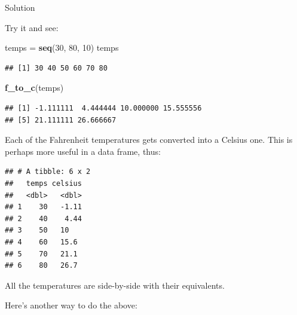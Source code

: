 \documentclass[]{tufte-book}
\newenvironment{Shaded}{}{}
\newcommand{\DataTypeTok}[1]{\textcolor[rgb]{0.56,0.13,0.00}{#1}}
\newcommand{\DecValTok}[1]{\textcolor[rgb]{0.25,0.63,0.44}{#1}}
\newcommand{\KeywordTok}[1]{\textcolor[rgb]{0.00,0.44,0.13}{\textbf{#1}}}
\newcommand{\NormalTok}[1]{#1}
\newcommand{\OperatorTok}[1]{\textcolor[rgb]{0.40,0.40,0.40}{#1}}
\newcommand{\StringTok}[1]{\textcolor[rgb]{0.25,0.44,0.63}{#1}}
\theoremstyle{definition}
\theoremstyle{definition}
\theoremstyle{definition}
\theoremstyle{remark}
\begin{document}
Solution

Try it and see:

\begin{Shaded}
\begin{Highlighting}[]
\NormalTok{temps =}\StringTok{ }\KeywordTok{seq}\NormalTok{(}\DecValTok{30}\NormalTok{, }\DecValTok{80}\NormalTok{, }\DecValTok{10}\NormalTok{)}
\NormalTok{temps}
\end{Highlighting}
\end{Shaded}

\begin{verbatim}
## [1] 30 40 50 60 70 80
\end{verbatim}

\begin{Shaded}
\begin{Highlighting}[]
\KeywordTok{f_to_c}\NormalTok{(temps)}
\end{Highlighting}
\end{Shaded}

\begin{verbatim}
## [1] -1.111111  4.444444 10.000000 15.555556
## [5] 21.111111 26.666667
\end{verbatim}

Each of the Fahrenheit temperatures gets converted into a Celsius one.
This is perhaps more useful in a data frame, thus:

\begin{Shaded}
\end{Shaded}

\begin{verbatim}
## # A tibble: 6 x 2
##   temps celsius
##   <dbl>   <dbl>
## 1    30   -1.11
## 2    40    4.44
## 3    50   10   
## 4    60   15.6 
## 5    70   21.1 
## 6    80   26.7
\end{verbatim}

All the temperatures are side-by-side with their equivalents.

Here's another way to do the above:

\begin{Shaded}
\end{Shaded}
\end{document}
